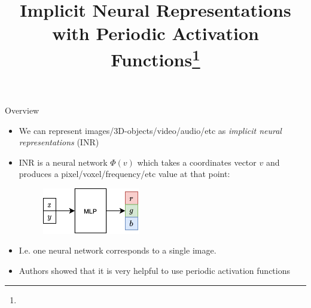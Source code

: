 \documentclass[handout, 10pt]{beamer}
\title{Implicit Neural Representations with Periodic Activation Functions\footnote{\citepaper{SIREN}}}
\begin{document}
\begin{frame}
    \titlepage
\end{frame}

\begin{frame}{Overview}
    \begin{itemize}
        \item\pause We can represent images/3D-objects/video/audio/etc as \textit{implicit neural representations} (INR)
        \item\pause INR is a neural network $\Phi(v)$ which takes a coordinates vector $v$ and produces a pixel/voxel/frequency/etc value at that point:
        \begin{figure}
            \centering
            \includegraphics[width=0.4\textwidth]{images/inr}
        \end{figure}
        \item\pause I.e. one neural network corresponds to a single image.
        \item\pause Authors showed that it is very helpful to use periodic activation functions
    \end{itemize}
\end{frame}
\end{document}
